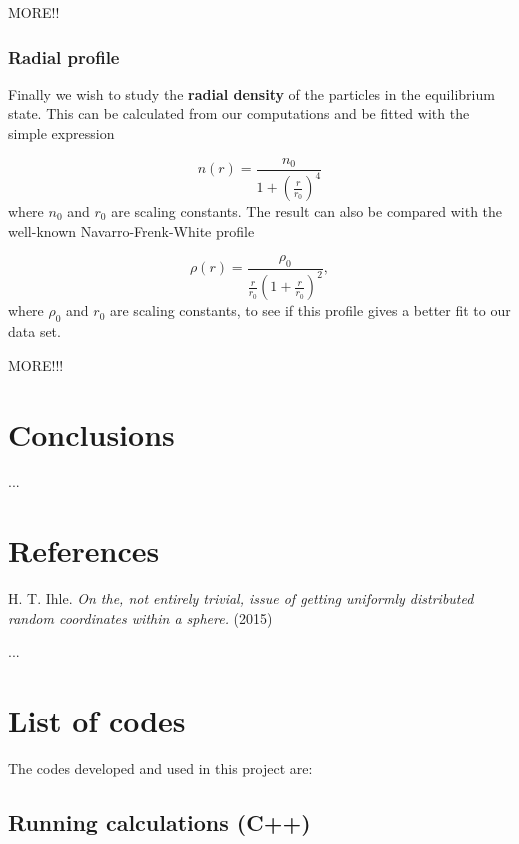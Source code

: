 \documentclass{article}
\begin{document}
\begin{multicols}{2}
MORE!!



\subsubsection{Radial profile}

Finally we wish to study the \textbf{radial density} of the particles in the equilibrium state. This can be calculated from our computations and be fitted with the simple expression

\begin{equation}\label{eq:simple_fit}
	n(r) = \frac{n_0}{1 + (\frac{r}{r_0})^4}
\end{equation}
where $n_0$ and $r_0$ are scaling constants. The result can also be compared with the well-known Navarro-Frenk-White profile

\begin{equation}\label{eq:NFW}
	\rho(r) = \frac{\rho_0}{  \frac{r}{r_0} (1 + \frac{r}{r_0})^2  },
\end{equation}
where $\rho_0$ and $r_0$ are scaling constants, to see if this profile gives a better fit to our data set. 

MORE!!!






\section{Conclusions}

...


\section{References}

H. T. Ihle. \textit{On the, not entirely trivial, issue of getting uniformly distributed random coordinates within a sphere.} (2015)

...



\section{List of codes}

The codes developed and used in this project are: 


\subsection{Running calculations (C++)}


\end{multicols}
\end{document}
